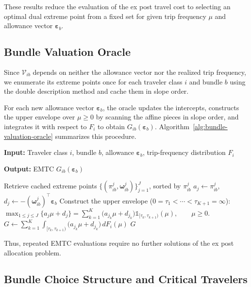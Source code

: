 \documentclass{article}
\newcommand{\mbbone}{\mathbb{1}}
\begin{document}
These results reduce the evaluation of the ex post travel cost to selecting
an optimal dual extreme point from a fixed set for given trip frequency
$\mu$ and allowance vector $\bm\varepsilon_b$.

\subsection{Bundle Valuation Oracle}
\label{sec:bundle-valuation-oracle}

Since $\mathcal V_{ib}$ depends on neither the allowance vector nor the
realized trip frequency, we enumerate its extreme points once for each
traveler class $i$ and bundle $b$ using the double description method
\citep{FukudaProdon1996} and cache them in slope order.

For each new allowance vector $\bm\varepsilon_b$, the oracle updates the
intercepts, constructs the upper envelope over $\mu\geq0$ by scanning the
affine pieces in slope order, and integrates it with respect to $F_i$ to
obtain $G_{ib}(\bm\varepsilon_b)$.
Algorithm~\ref{alg:bundle-valuation-oracle} summarizes this procedure.

\begin{algorithm}[t]
\caption{Bundle valuation oracle}
\label{alg:bundle-valuation-oracle}
\noindent\textbf{Input:} Traveler class $i$, bundle $b$, allowance $\bm\varepsilon_b$,
trip-frequency distribution $F_i$\par
\noindent\textbf{Output:} EMTC $G_{ib}(\bm\varepsilon_b)$\par
\begin{algorithmic}[1]
\State Retrieve cached extreme points
$\{(\pi_{ib}^j,\bm\omega_{ib}^j)\}_{j=1}^J$, sorted by $\pi_{ib}^j$
    \State $a_j\gets\pi_{ib}^j$,
    \quad $d_j\gets-(\bm\omega_{ib}^j)^\top\bm\varepsilon_b$
\EndFor
\State Construct the upper envelope ($0=\tau_1<\cdots<\tau_{K+1}=\infty$):
\Statex \(\displaystyle
    \max_{1\leq j\leq J}\{a_j\mu+d_j\}
    =\sum_{k=1}^K
    \bigl(a_{j_k}\mu+d_{j_k}\bigr)
    \mbbone_{[\tau_k,\tau_{k+1})}(\mu),
    \qquad \mu\geq0.
\)
\State $\displaystyle G\gets
\sum_{k=1}^K\int_{[\tau_k,\tau_{k+1})}
\bigl(a_{j_k}\mu+d_{j_k}\bigr)\,dF_i(\mu)$
\State \Return $G$
\end{algorithmic}
\end{algorithm}

Thus, repeated EMTC evaluations require no further solutions of the
ex post allocation problem.

\subsection{Bundle Choice Structure and Critical Travelers}
\label{sec:bundle-segmentation}
\end{document}

